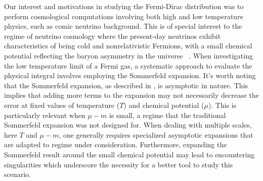 \documentclass[sn-mathphys,Numbered]{sn-jnl}
\begin{document}
Our interest and motivations in studying the Fermi-Dirac distribution was to perform cosmological computations involving both high and low temperature physics, such as comic neutrino background. This is of special interest to the regime of neutrino cosmology where the present-day neutrinos exhibit characteristics of being cold and nonrelativistic Fermions, with a small chemical potential reflecting the baryon asymmetry in the universe ~\cite{Birrell:2013gpa,Birrell:2012gg}. When investigating the low temperature limit of a Fermi gas, a systematic approach to evaluate the physical integral involves employing the Sommerfeld expansion. It's worth noting that the Sommerfeld expansion, as described in \cite{landau2013statistical}, is asymptotic in nature. This implies that adding more terms to the expansion may not necessarily decrease the error at fixed values of temperature ($T$) and chemical potential ($\mu$). This is particularly relevant when $\mu-m$ is small, a regime that the traditional Sommerfeld expansion was not designed for. When dealing with multiple scales, here $T$ and $\mu-m$, one generally requires specialized asymptotic expansions that are adapted to regime under consideration. Furthermore, expanding the Sommerfeld result around the small chemical potential may lead to encountering singularities which underscore the necessity for a better tool to study this scenario. 
\end{document}

